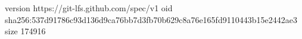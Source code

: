 version https://git-lfs.github.com/spec/v1
oid sha256:537d91786c93d136d9ca76bb7d3fb70b629c8a76e165fd9110443b15e2442ae3
size 174916
